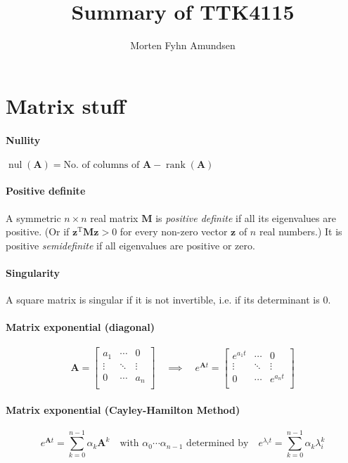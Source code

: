 \documentclass[a4paper]{article}
\title{Summary of TTK4115}
\author{Morten Fyhn Amundsen}
\affil{NTNU}
\newcommand{\M}[1]{\bm{#1}}
\newcommand{\V}[1]{\mathbf{#1}}
\newcommand{\transpose}{^{\text{T}}}
\DeclareMathOperator{\nul}{nul}
\DeclareMathOperator{\rank}{rank}
\begin{document}
\maketitle



\section{Matrix stuff}
\paragraph{Nullity}
$\nul(\M{A}) = \mbox{No. of columns of } \M{A} - \rank(\M{A})$

\paragraph{Positive definite}
A symmetric $n \times n$ real matrix $\M{M}$ is \emph{positive definite} if all its eigenvalues are positive. (Or if $\V{z}\transpose \M{M}\V{z} > 0$ for every non-zero vector $\V{z}$ of $n$ real numbers.) It is positive \emph{semidefinite} if all eigenvalues are positive or zero.

\paragraph{Singularity}
A square matrix is singular if it is not invertible, i.e. if its determinant is $0$.

\paragraph{Matrix exponential (diagonal)}
$$\M{A} =
\begin{bmatrix}
a_1		& \cdots	& 0			\\
\vdots 	& \ddots	& \vdots	\\
0		& \cdots	& a_n		\\
\end{bmatrix}
\quad \implies \quad
e^{\M{A}t} =
\begin{bmatrix}
e^{a_1t}	& \cdots	& 0			\\
\vdots 		& \ddots	& \vdots	\\
0			& \cdots	& e^{a_nt}	\\
\end{bmatrix}$$

\paragraph{Matrix exponential (Cayley-Hamilton Method)}
$$e^{\M{A}t} = \sum_{k=0}^{n-1} \alpha_k \M{A}^k
\quad \text {with } \alpha_0 \cdots \alpha_{n-1} \text{ determined by} \quad
e^{\lambda_i t} = \sum_{k=0}^{n-1} \alpha_k \lambda_i^k$$
\end{document}
